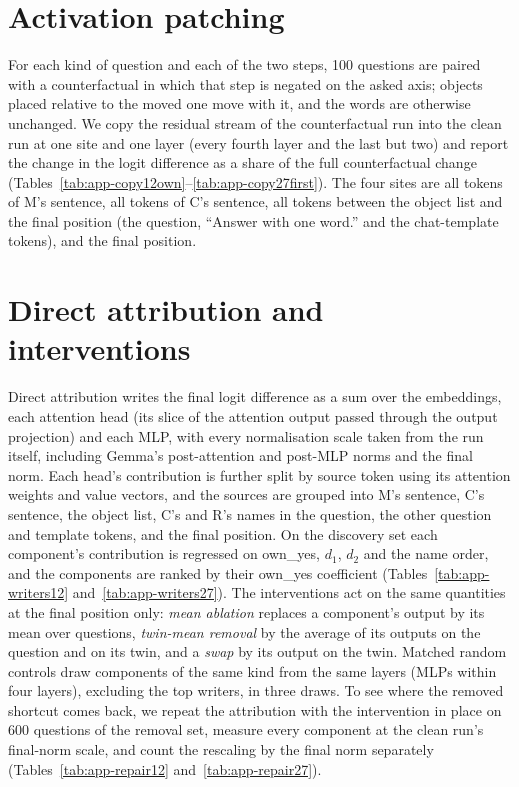 \section{Activation patching}\label{app:patching}
For each kind of question and each of the two steps, 100 questions are paired with a counterfactual in which that step
is negated on the asked axis; objects placed relative to the moved one move with it, and the words are otherwise
unchanged. We copy the residual stream of the counterfactual run into the clean run at one site and one layer (every
fourth layer and the last but two) and report the change in the logit difference as a share of the full
counterfactual change (Tables~\ref{tab:app-copy12own}--\ref{tab:app-copy27first}). The four sites are all tokens of
M's sentence, all tokens of C's sentence, all tokens between the object list and the final position (the question,
``Answer with one word.'' and the chat-template tokens), and the final position.

\section{Direct attribution and interventions}\label{app:attribution}
Direct attribution writes the final logit difference as a sum over the embeddings, each attention head (its slice of
the attention output passed through the output projection) and each MLP, with every normalisation scale taken from the
run itself, including Gemma's post-attention and post-MLP norms and the final norm. Each head's contribution is further
split by source token using its attention weights and value vectors, and the sources are grouped into M's sentence, C's
sentence, the object list, C's and R's names in the question, the other question and template tokens, and the final
position. On the discovery set each component's contribution is regressed on own\_yes, $d_1$, $d_2$ and the name order,
and the components are ranked by their own\_yes coefficient (Tables~\ref{tab:app-writers12}
and~\ref{tab:app-writers27}). The interventions act on the same quantities at the final position only: \emph{mean
ablation} replaces a component's output by its mean over questions, \emph{twin-mean removal} by the average of its
outputs on the question and on its twin, and a \emph{swap} by its output on the twin. Matched random controls draw
components of the same kind from the same layers (MLPs within four layers), excluding the top writers, in three draws.
To see where the removed shortcut comes back, we repeat the attribution with the intervention in place on 600 questions
of the removal set, measure every component at the clean run's final-norm scale, and count the rescaling by the final
norm separately (Tables~\ref{tab:app-repair12} and~\ref{tab:app-repair27}).

